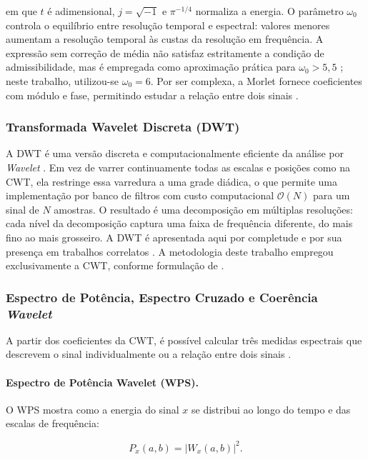 \noindent
em que $t$ é adimensional, $j=\sqrt{-1}$ e $\pi^{-1/4}$ normaliza a energia.
O parâmetro $\omega_0$ controla o equilíbrio
entre resolução temporal e espectral: valores menores aumentam a resolução temporal às
custas da resolução em frequência. A expressão sem correção de média não satisfaz
estritamente a condição de admissibilidade, mas é empregada como aproximação
prática para $\omega_0>5{,}5$ \cite{schuck2019}; neste trabalho, utilizou-se
$\omega_0=6$. Por ser complexa, a Morlet fornece coeficientes com módulo e fase,
permitindo estudar a relação entre dois sinais \cite{torrence1998}.

\subsubsection{Transformada Wavelet Discreta (DWT)}\label{sec:dwt}

A DWT é uma versão discreta e computacionalmente eficiente da análise por
\textit{Wavelet} \cite{mallat1999}. Em vez de varrer continuamente todas as escalas
e posições como na CWT, ela restringe essa varredura a uma grade diádica, o que
permite uma implementação por banco de filtros com custo computacional
$\mathcal{O}(N)$ para um sinal de $N$ amostras. O resultado é uma decomposição
em múltiplas resoluções: cada nível da decomposição captura uma faixa de frequência
diferente, do mais fino ao mais grosseiro. A DWT é apresentada aqui por completude
e por sua presença em trabalhos correlatos \cite{morshed2020,dias2025knn}. A
metodologia deste trabalho empregou exclusivamente a CWT, conforme formulação
de .

\subsubsection{Espectro de Potência, Espectro Cruzado e Coerência \textit{Wavelet}}\label{sec:wps-wcs-wco}

A partir dos coeficientes da CWT, é possível calcular três medidas espectrais que descrevem
o sinal individualmente ou a relação entre dois sinais \cite{torrence1998}.

\paragraph{Espectro de Potência Wavelet (WPS).}
O WPS mostra como a energia do sinal $x$ se distribui ao longo do tempo e das escalas
de frequência:

\begin{equation}\label{eq:wps}
  P_x(a, b) = |W_x(a, b)|^2.
\end{equation}

